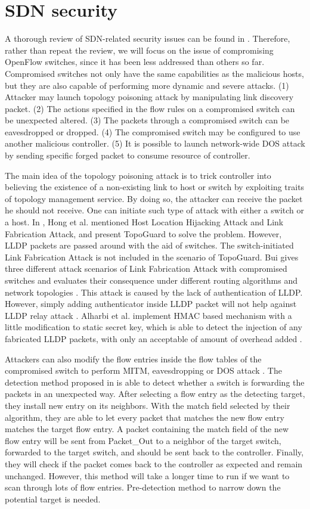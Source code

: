 \section{SDN security}
\label{SDN security}
A thorough review of SDN-related security issues can be found in \cite{LAB14, CM, SOS13, KJK}. Therefore, rather than repeat the review, we will focus on the issue of compromising OpenFlow switches, since it has been less addressed than others so far. Compromised switches not only have the same capabilities as the malicious hosts, but they are also capable of performing more dynamic and severe attacks. (1) Attacker may launch topology poisoning attack by manipulating link discovery packet. (2) The actions specified in the flow rules on a compromised switch can be unexpected altered. (3) The packets through a compromised switch can be eavesdropped or dropped. (4) The compromised switch may be configured to use another malicious controller. (5) It is possible to launch network-wide DOS attack by sending specific forged packet to consume resource of controller.

The main idea of the topology poisoning attack is to trick controller into believing the existence of a non-existing link to host or switch by exploiting traits of topology management service. By doing so, the attacker can receive the packet he should not receive. One can initiate such type of attack with either a switch or a host. In \cite{HXWG15}, Hong et al. mentioned Host Location Hijacking Attack and Link Fabrication Attack, and present TopoGuard to solve the problem. However, LLDP packets are passed around with the aid of switches. The switch-initiated Link Fabrication Attack is not included in the scenario of TopoGuard. Bui gives three different attack scenarios of Link Fabrication Attack with compromised switches and evaluates their consequence under different routing algorithms and network topologies \cite{TTB15}. This attack is caused by the lack of authentication of LLDP. However, simply adding authenticator inside LLDP packet will not help against LLDP relay attack \cite{HXWG15}. Alharbi et al. implement HMAC based mechanism with a little modification to static secret key, which is able to detect the injection of any fabricated LLDP packets, with only an acceptable of amount of overhead added \cite{ATPP15}.

Attackers can also modify the flow entries inside the flow tables of the compromised switch to perform MITM, eavesdropping or DOS attack \cite{AAS14}. The detection method proposed in \cite{CKGL15} is able to detect whether a switch is forwarding the packets in an unexpected way. After selecting a flow entry as the detecting target, they install new entry on its neighbors. With the match field selected by their algorithm, they are able to let every packet that matches the new flow entry matches the target flow entry. A packet containing the match field of the new flow entry will be sent from Packet\_Out to a neighbor of the target switch, forwarded to the target switch, and should be sent back to the controller. Finally, they will check if the packet comes back to the controller as expected and remain unchanged. However, this method will take a longer time to run if we want to scan through lots of flow entries. Pre-detection method to narrow down the potential target is needed.